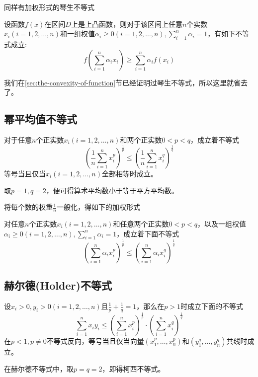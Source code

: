 同样有加权形式的琴生不等式
\begin{theorem}[加权形式的琴生不等式]
  设函数$f(x)$在区间$D$上是上凸函数，则对于该区间上任意$n$个实数$x_i(i=1,2,\ldots,n)$和一组权值$\alpha_i\geqslant 0(i=1,2,\ldots,n), \sum_{i=1}^n\alpha_i=1$，有如下不等式成立:
  \begin{equation}
    \label{eq:jenson-inequality-some-import-inequality}
    f \left( \sum_{i=1}^n\alpha_ix_i \right) \geqslant
    \sum_{i=1}^n \alpha_if(x_i)
  \end{equation}
\end{theorem}

我们在\ref{sec:the-convexity-of-function}节已经证明过琴生不等式，所以这里就省去了。

\subsection{幂平均值不等式}

\begin{theorem}[幂平均值不等式]
  对于任意$n$个正实数$x_i(i=1,2,\ldots,n)$和两个正实数$0<p<q$，成立着不等式
  \begin{equation}
    \label{eq:pow-mean-inequation}
    \left( \frac{1}{n}\sum_{i=1}^nx_i^{p} \right)^{\frac{1}{p}}
    \leqslant \left( \frac{1}{n}\sum_{i=1}^nx_i^{q} \right)^{\frac{1}{q}}
  \end{equation}
  等号当且仅当$x_i(i=1,2,\ldots,n)$全部相等时成立。
\end{theorem}
取$p=1,q=2$，便可得算术平均数小于等于平方平均数。

将每个数的权重$\frac{1}{n}$一般化，得如下的加权形式
\begin{theorem}[加权幂平均值不等式]
  对任意$n$个正实数$x_i(i=1,2,\ldots,n)$和任意两个正实数$0<p<q$，以及一组权值$\alpha_i \geqslant 0(i=1,2,\ldots,n), \sum_{i=1}^n\alpha_i=1$，成立着下面不等式
  \begin{equation}
    \label{eq:pow-mean-inequation-with-weight}
    \left( \sum_{i=1}^n\alpha_ix_i^p \right)^{\frac{1}{p}}
    \leqslant \left( \sum_{i=1}^n\alpha_ix_i^q \right)^{\frac{1}{q}}
  \end{equation}
\end{theorem}

\subsection{赫尔德(Holder)不等式}

\begin{theorem}[赫尔德不等式]
  设$x_i> 0, y_i> 0 (i=1,2,\ldots,n)$且$\frac{1}{p}+\frac{1}{q}=1$，那么在$p>1$时成立下面的不等式
  \begin{equation}
    \label{eq:holder-inequation}
    \sum_{i=1}^nx_iy_i \leqslant \left( \sum_{i=1}^nx_i^p \right)^{\frac{1}{p}} \cdot \left( \sum_{i=1}^nx_i^q \right)^{\frac{1}{q}}
  \end{equation}
  在$p<1,p\neq 0$不等式反向，等号当且仅当向量$(x_1^p,\ldots,x_n^p)$和$(y_1^q,\ldots,y_n^q)$共线时成立。
\end{theorem}
在赫尔德不等式中，取$p=q=2$，即得柯西不等式。

